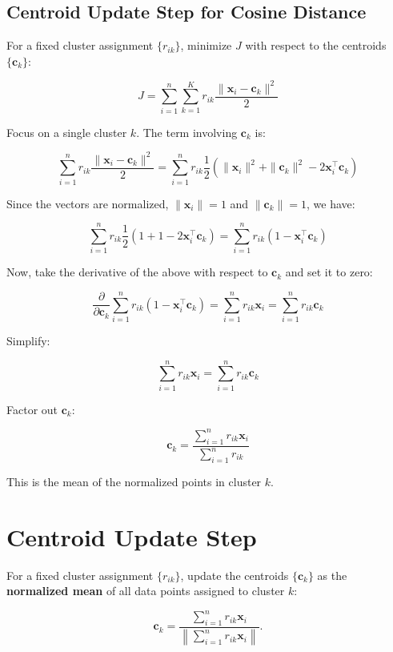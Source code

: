 \documentclass[12pt,twoside,a4paper,parskip]{scrbook} %
\begin{document}
\subsection*{Centroid Update Step for Cosine Distance}
For a fixed cluster assignment \( \{ r_{ik} \} \), minimize \( J \) with respect to the centroids \( \{ \mathbf{c}_k \} \):

\[
J = \sum_{i=1}^{n} \sum_{k=1}^{K} r_{ik} \frac{\|\mathbf{x}_i - \mathbf{c}_k\|^2}{2}
\]

Focus on a single cluster \( k \). The term involving \( \mathbf{c}_k \) is:

\[
\sum_{i=1}^{n} r_{ik} \frac{\|\mathbf{x}_i - \mathbf{c}_k\|^2}{2}
= \sum_{i=1}^{n} r_{ik} \frac{1}{2} \left( \|\mathbf{x}_i\|^2 + \|\mathbf{c}_k\|^2 - 2 \mathbf{x}_i^\top \mathbf{c}_k \right)
\]

Since the vectors are normalized, \( \|\mathbf{x}_i\| = 1 \) and \( \|\mathbf{c}_k\| = 1 \), we have:

\[
\sum_{i=1}^{n} r_{ik} \frac{1}{2} \left( 1 + 1 - 2 \mathbf{x}_i^\top \mathbf{c}_k \right)
= \sum_{i=1}^{n} r_{ik} \left( 1 - \mathbf{x}_i^\top \mathbf{c}_k \right)
\]

Now, take the derivative of the above with respect to \( \mathbf{c}_k \) and set it to zero:

\[
\frac{\partial}{\partial \mathbf{c}_k} \sum_{i=1}^{n} r_{ik} \left( 1 - \mathbf{x}_i^\top \mathbf{c}_k \right)
= \sum_{i=1}^{n} r_{ik} \mathbf{x}_i = \sum_{i=1}^{n} r_{ik} \mathbf{c}_k
\]

Simplify:

\[
\sum_{i=1}^{n} r_{ik} \mathbf{x}_i = \sum_{i=1}^{n} r_{ik} \mathbf{c}_k
\]

Factor out \( \mathbf{c}_k \):

\[
\mathbf{c}_k = \frac{\sum_{i=1}^{n} r_{ik} \mathbf{x}_i}{\sum_{i=1}^{n} r_{ik}}
\]

This is the mean of the normalized points in cluster \( k \).

\section*{Centroid Update Step}

For a fixed cluster assignment \( \{ r_{ik} \} \), update the centroids \( \{ \mathbf{c}_k \} \) as the \textbf{normalized mean} of all data points assigned to cluster \( k \):

\[
\mathbf{c}_k = \frac{\sum_{i=1}^{n} r_{ik} \mathbf{x}_i}{\left\| \sum_{i=1}^{n} r_{ik} \mathbf{x}_i \right\|}.
\]
\end{document}
